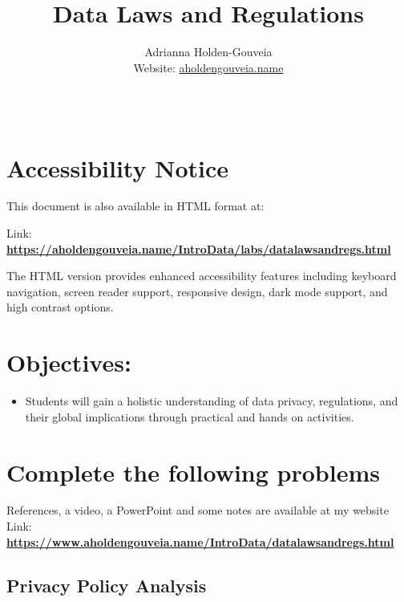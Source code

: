 \documentclass[12pt]{article}
\title{Data Laws and Regulations}
\author{
        Adrianna Holden-Gouveia \\
        Website: \href{https://aholdengouveia.name}{aholdengouveia.name}\\ 
        \date{\vspace{-5ex}}
        \faGithub {: aholdengouveia} \\
        }
\begin{document}
    

\maketitle



\section*{Accessibility Notice}
This document is also available in HTML format at:

Link: \href{https://aholdengouveia.name/IntroData/labs/datalawsandregs.html}{\textbf{https://aholdengouveia.name/IntroData/labs/datalawsandregs.html}}

The HTML version provides enhanced accessibility features including keyboard navigation, screen reader support, responsive design, dark mode support, and high contrast options.

\section*{Objectives:}
\begin{itemize}
    \item Students will gain a holistic understanding of data privacy, regulations, and their global implications through practical and hands on activities.
\end{itemize}
\section*{Complete the following problems}

References, a video, a PowerPoint and some notes are available at my website
Link: \href{https://www.aholdengouveia.name/IntroData/datalawsandregs.html}{\textbf{https://www.aholdengouveia.name/IntroData/datalawsandregs.html}}


\subsection*{Privacy Policy Analysis}
\end{document}
